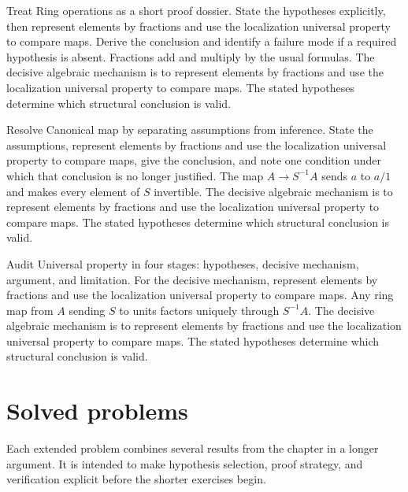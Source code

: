 \begin{example}\label{ex:v06-worked-02}
Treat Ring operations as a short proof dossier. State the hypotheses explicitly, then represent elements by fractions and use the localization universal property to compare maps. Derive the conclusion and identify a failure mode if a required hypothesis is absent. Fractions add and multiply by the usual formulas. The decisive algebraic mechanism is to represent elements by fractions and use the localization universal property to compare maps. The stated hypotheses determine which structural conclusion is valid.
\end{example}

\begin{example}\label{ex:v06-worked-03}
Resolve Canonical map by separating assumptions from inference. State the assumptions, represent elements by fractions and use the localization universal property to compare maps, give the conclusion, and note one condition under which that conclusion is no longer justified. The map $A\to S^{-1}A$ sends $a$ to $a/1$ and makes every element of $S$ invertible. The decisive algebraic mechanism is to represent elements by fractions and use the localization universal property to compare maps. The stated hypotheses determine which structural conclusion is valid.
\end{example}

\begin{example}\label{ex:v06-worked-04}
Audit Universal property in four stages: hypotheses, decisive mechanism, argument, and limitation. For the decisive mechanism, represent elements by fractions and use the localization universal property to compare maps. Any ring map from $A$ sending $S$ to units factors uniquely through $S^{-1}A$. The decisive algebraic mechanism is to represent elements by fractions and use the localization universal property to compare maps. The stated hypotheses determine which structural conclusion is valid.
\end{example}

\section{Solved problems}
Each extended problem combines several results from the chapter in a longer argument. It is intended to make hypothesis selection, proof strategy, and verification explicit before the shorter exercises begin.

